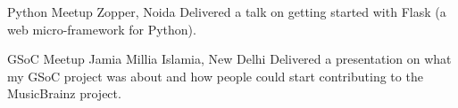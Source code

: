 
\cventry{}
    {Python Meetup}
    {}
    {Zopper, Noida}
    {}
    {
        Delivered a talk on getting started with Flask (a web micro-framework for Python).
    }
    \vspace*{0.2\baselineskip}

\cventry{}
    {GSoC Meetup}
    {}
    {Jamia Millia Islamia, New Delhi}
    {}
    {
        Delivered a presentation on what my GSoC project was about and how people could
        start contributing to the MusicBrainz project.
    }
    \vspace*{0.2\baselineskip}
